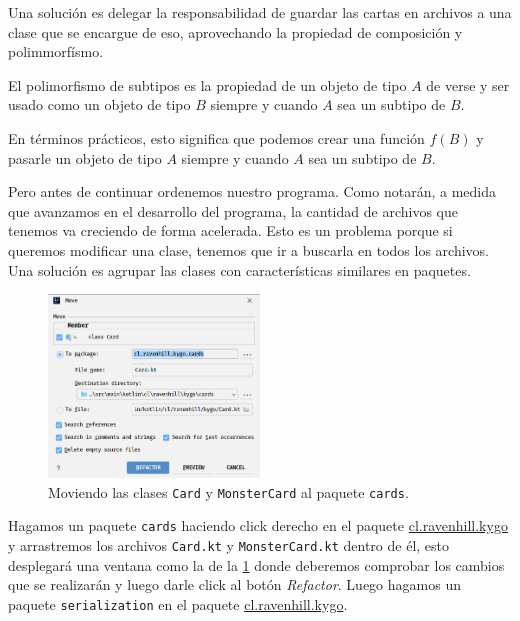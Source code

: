   Una solución es delegar la responsabilidad de guardar las cartas en archivos a una clase que se 
  encargue de eso, aprovechando la propiedad de composición y polimmorfísmo.

  \begin{defaultbox}
    El polimorfismo de subtipos es la propiedad de un objeto de tipo \(A\) de verse y ser usado como
    un objeto de tipo \(B\) siempre y cuando \(A\) sea un subtipo de \(B\).
  \end{defaultbox}

  En términos prácticos, esto significa que podemos crear una función \(f(B)\) y pasarle un objeto
  de tipo \(A\) siempre y cuando \(A\) sea un subtipo de \(B\).

  Pero antes de continuar ordenemos nuestro programa.
  Como notarán, a medida que avanzamos en el desarrollo del programa, la cantidad de archivos que
  tenemos va creciendo de forma acelerada.
  Esto es un problema porque si queremos modificar una clase, tenemos que ir a buscarla en todos
  los archivos.
  Una solución es agrupar las clases con características similares en paquetes.

  \begin{figure}[ht!]
    \centering
    \includegraphics[width=0.5\textwidth]{img/oop/principios/clases_abstractas/idea64_move.png}
    \caption{Moviendo las clases \texttt{Card} y \texttt{MonsterCard} al paquete \texttt{cards}.}
    \label{fig:oop:principios:clases_abstractas:move}
  \end{figure}

  Hagamos un paquete \texttt{cards} haciendo click derecho en el paquete 
  \url{cl.ravenhill.kygo} y arrastremos los archivos \texttt{Card.kt} y
  \texttt{MonsterCard.kt} dentro de él, esto desplegará una ventana como la de la 
  \cref{fig:oop:principios:clases_abstractas:move} donde deberemos comprobar los cambios que se
  realizarán y luego darle click al botón \textit{Refactor}.
  Luego hagamos un paquete \texttt{serialization} en el paquete \url{cl.ravenhill.kygo}.

